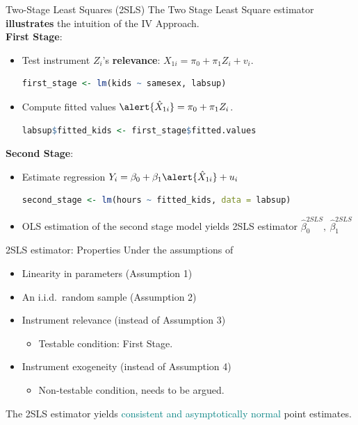 \documentclass[11pt, aspectratio = 169]{beamer}
\begin{document}
\begin{frame}[fragile]{Two-Stage Least Squares (2SLS)}
The Two Stage Least Square estimator \textbf{illustrates} the intuition of the IV Approach.
\\
\vspace{2mm}
\pause
\color{teal}\textbf{First Stage}: \color{black} 
\begin{itemize}
    \item Test instrument $Z_i$'s \textbf{relevance}: $X_{1i} = \pi_0 + \pi_1 Z_i + v_i$.
    \begin{lstlisting}[language=R]
    first_stage <- lm(kids ~ samesex, labsup)
    \end{lstlisting}
    \pause
    \item Compute fitted values $\alert{\hat{X}_{1i} }= \pi_0 + \pi_1 Z_i$.
    \begin{lstlisting}[language=R]
    labsup$fitted_kids <- first_stage$fitted.values
    \end{lstlisting}
\end{itemize}
\pause
\color{teal} \textbf{Second Stage}: \color{black} 
\begin{itemize}
    \item Estimate regression $Y_{i} = \beta_0 + \beta_1 \alert{\hat{X}_{1i}} + u_i$
    \begin{lstlisting}[language=R]
    second_stage <- lm(hours ~ fitted_kids, data = labsup)
    \end{lstlisting}
    \item[$\rightarrow$] OLS estimation of the second stage model yields 2SLS estimator $\hat{\beta}^{2SLS}_0, \: \hat{\beta}^{2SLS}_1$
\end{itemize}

\end{frame}


\begin{frame}{2SLS estimator: Properties}
Under the assumptions of 
\begin{itemize}
    \item Linearity in parameters (Assumption 1)
    \item An i.i.d.\ random sample (Assumption 2)
    \pause
    \item Instrument relevance (instead of Assumption 3)
    \begin{itemize}
        \item[$\rightarrow$] Testable condition: First Stage.
    \end{itemize}
    \item Instrument exogeneity (instead of Assumption 4)
    \begin{itemize}
        \item[$\rightarrow$] Non-testable condition, needs to be argued. 
    \end{itemize}
\end{itemize}
\begin{center}
The 2SLS estimator yields \textcolor{teal}{consistent and asymptotically normal} point estimates.    
\end{center}
\end{frame}
\end{document}
